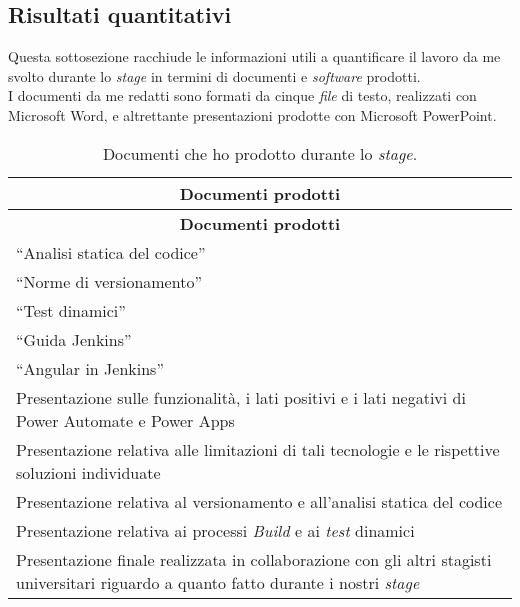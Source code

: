 \subsection{Risultati quantitativi}
Questa sottosezione racchiude le informazioni utili a quantificare il lavoro da me svolto durante lo \emph{stage} in termini di documenti e \emph{software} prodotti.\\
I documenti da me redatti sono formati da cinque \emph{file} di testo, realizzati con Microsoft Word, e altrettante presentazioni prodotte con Microsoft PowerPoint.
\begingroup
\renewcommand\arraystretch{1.3}
\begin{longtable}{|p{11cm}|}
    \caption{Documenti che ho prodotto durante lo \emph{stage}.}
    \label{tab:risultatiQualitativi}\\
    \hline \multicolumn{1}{|c|}{\textbf{Documenti prodotti}}\\  \endfirsthead
    \hline \multicolumn{1}{|c|}{\textbf{Documenti prodotti}}\\  \endhead
    \endfoot
    \hline \endlastfoot
    \hline “Analisi statica del codice”\\
    \hline “Norme di versionamento”\\
    \hline “Test dinamici”\\
    \hline “Guida Jenkins”\\
    \hline “Angular in Jenkins”\\
    \hline Presentazione sulle funzionalità, i lati positivi e i lati negativi di Power Automate e Power Apps\\
    \hline Presentazione relativa alle limitazioni di tali tecnologie e le rispettive soluzioni individuate\\
    \hline Presentazione relativa al versionamento e all'analisi statica del codice\\
    \hline Presentazione relativa ai processi \emph{Build} e ai \emph{test} dinamici\\
    \hline Presentazione finale realizzata in collaborazione con gli altri stagisti universitari riguardo a quanto fatto durante i nostri \emph{stage}\\
\end{longtable}
\endgroup
 
